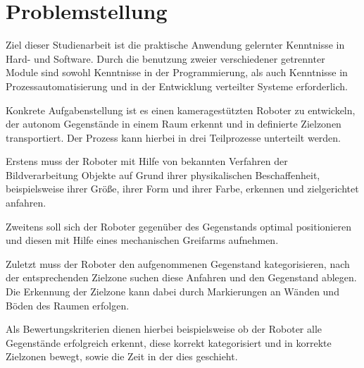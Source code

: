 \chapter{Problemstellung}
\label{cha:Problemstellung}

Ziel dieser Studienarbeit ist die praktische Anwendung gelernter Kenntnisse in Hard- und Software. Durch die benutzung zweier verschiedener getrennter Module sind sowohl Kenntnisse in der Programmierung, als auch Kenntnisse in Prozessautomatisierung und in der Entwicklung verteilter Systeme erforderlich.

Konkrete Aufgabenstellung ist es einen kameragestützten Roboter zu entwickeln, der autonom Gegenstände in einem Raum erkennt und in definierte Zielzonen transportiert. Der Prozess kann hierbei in drei Teilprozesse unterteilt werden. 

Erstens muss der Roboter mit Hilfe von bekannten Verfahren der Bildverarbeitung Objekte auf Grund ihrer physikalischen Beschaffenheit, beispielsweise ihrer Größe, ihrer Form und ihrer Farbe, erkennen und zielgerichtet anfahren.

Zweitens soll sich der Roboter gegenüber des Gegenstands optimal positionieren und diesen mit Hilfe eines mechanischen Greifarms aufnehmen.

Zuletzt muss der Roboter den aufgenommenen Gegenstand kategorisieren, nach der entsprechenden Zielzone suchen diese Anfahren und den Gegenstand ablegen. Die Erkennung der Zielzone kann dabei durch Markierungen an Wänden und Böden des Raumen erfolgen.

Als Bewertungskriterien dienen hierbei beispielsweise ob der Roboter alle Gegenstände erfolgreich erkennt, diese korrekt kategorisiert und in korrekte Zielzonen bewegt, sowie die Zeit in der dies geschieht.
